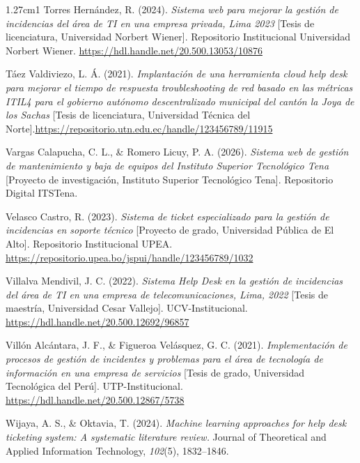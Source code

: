 \begin{hangparas}{1.27cm}{1}
Torres Hernández, R. (2024). \textit{Sistema web para mejorar la gestión de incidencias del área de TI en una empresa privada, Lima 2023} [Tesis de licenciatura, Universidad Norbert Wiener]. Repositorio Institucional Universidad Norbert Wiener. \url{https://hdl.handle.net/20.500.13053/10876}

\vspace{0.8em}

Táez Valdiviezo, L. Á. (2021). \textit{Implantación de una herramienta cloud help desk para mejorar el tiempo de respuesta troubleshooting de red basado en las métricas ITIL4 para el gobierno autónomo descentralizado municipal del cantón la Joya de los Sachas} [Tesis de licenciatura, Universidad Técnica del Norte].\url{https://repositorio.utn.edu.ec/handle/123456789/11915}

\vspace{0.8em}

Vargas Calapucha, C. L., \& Romero Licuy, P. A. (2026). \textit{Sistema web de gestión de mantenimiento y baja de equipos del Instituto Superior Tecnológico Tena} [Proyecto de investigación, Instituto Superior Tecnológico Tena]. Repositorio Digital ITSTena.

\vspace{0.8em}

Velasco Castro, R. (2023). \textit{Sistema de ticket especializado para la gestión de incidencias en soporte técnico} [Proyecto de grado, Universidad Pública de El Alto]. Repositorio Institucional UPEA. \url{https://repositorio.upea.bo/jspui/handle/123456789/1032}

\vspace{0.8em}

Villalva Mendivil, J. C. (2022). \textit{Sistema Help Desk en la gestión de incidencias del área de TI en una empresa de telecomunicaciones, Lima, 2022} [Tesis de maestría, Universidad Cesar Vallejo]. UCV-Institucional. \url{https://hdl.handle.net/20.500.12692/96857}

\vspace{0.8em}

Villón Alcántara, J. F., \& Figueroa Velásquez, G. C. (2021). \textit{Implementación de procesos de gestión de incidentes y problemas para el área de tecnología de información en una empresa de servicios} [Tesis de grado, Universidad Tecnológica del Perú]. UTP-Institucional. \url{https://hdl.handle.net/20.500.12867/5738}
\vspace{0.8em}

Wijaya, A. S., \& Oktavia, T. (2024). \textit{Machine learning approaches for help desk ticketing system: A systematic literature review.} Journal of Theoretical and Applied Information Technology, \textit{102}(5), 1832--1846.

\end{hangparas}
